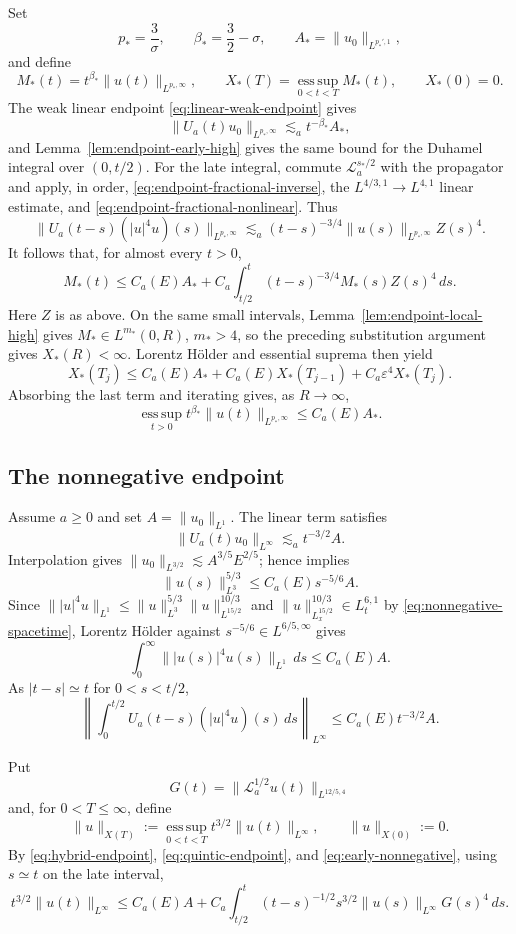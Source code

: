 \documentclass[preprint,12pt]{elsarticle}
\numberwithin{equation}{section}
\theoremstyle{definition}
\theoremstyle{remark}
\newcommand{\cL}{\mathcal L}
\newcommand{\norm}[2]{\lVert #1\rVert_{#2}}
\newcommand{\eps}{\varepsilon}
\begin{document}
Set
\[
 p_*=\frac3\sigma,\qquad
 \beta_*=\frac32-\sigma,\qquad
 A_*=\norm{u_0}{L^{p_*',1}},
\]
and define
\[
 M_*(t)=t^{\beta_*}\norm{u(t)}{L^{p_*,\infty}},
 \qquad X_*(T)=\operatorname*{ess\,sup}_{0<t<T}M_*(t),
 \qquad X_*(0)=0.
\]
The weak linear endpoint \eqref{eq:linear-weak-endpoint} gives
\[
 \norm{U_a(t)u_0}{L^{p_*,\infty}}
 \lesssim_a t^{-\beta_*}A_*,
\]
and Lemma~\ref{lem:endpoint-early-high} gives the same bound for the
Duhamel integral over $(0,t/2)$. For the late integral, commute
$\cL_a^{s_*/2}$ with the propagator and apply, in order,
\eqref{eq:endpoint-fractional-inverse}, the
$L^{4/3,1}\to L^{4,1}$ linear estimate, and
\eqref{eq:endpoint-fractional-nonlinear}. Thus
\[
 \norm{U_a(t-s)(|u|^4u)(s)}{L^{p_*,\infty}}
 \lesssim_a(t-s)^{-3/4}
 \norm{u(s)}{L^{p_*,\infty}}Z(s)^4.
\]
It follows that, for almost every $t>0$,
\[
 M_*(t)\leq C_a(E)A_*+
 C_a\int_{t/2}^t(t-s)^{-3/4}M_*(s)Z(s)^4\,ds.
\]
Here $Z$ is as above. On the same small intervals,
Lemma~\ref{lem:endpoint-local-high} gives $M_*\in L^{m_*}(0,R)$,
$m_*>4$, so the preceding substitution argument gives
$X_*(R)<\infty$. Lorentz H\"older and essential suprema then yield
\[
 X_*(T_j)
 \leq C_a(E)A_*+C_a(E)X_*(T_{j-1})
 +C_a\eps^4X_*(T_j).
\]
Absorbing the last term and iterating gives, as $R\to\infty$,
\[
 \operatorname*{ess\,sup}_{t>0}
 t^{\beta_*}\norm{u(t)}{L^{p_*,\infty}}
 \leq C_a(E)A_*.
\]

\subsection{The nonnegative endpoint}

Assume $a\geq0$ and set $A=\norm{u_0}{L^1}$.
The linear term satisfies
\[
 \norm{U_a(t)u_0}{L^\infty}\lesssim_a t^{-3/2}A.
\]
Interpolation gives $\norm{u_0}{L^{3/2}}\lesssim A^{3/5}E^{2/5}$;
hence \cite[Theorem~1.2, $p=3$]{WangXuZhang} implies
\[
 \norm{u(s)}{L^3}^{5/3}
 \leq C_a(E)s^{-5/6}A.
\]
Since $\norm{|u|^4u}{L^1}\leq
\norm{u}{L^3}^{5/3}\norm{u}{L^{15/2}}^{10/3}$ and
$\norm{u}{L_x^{15/2}}^{10/3}\in L_t^{6,1}$ by
\eqref{eq:nonnegative-spacetime}, Lorentz H\"older against
$s^{-5/6}\in L^{6/5,\infty}$ gives
\[
 \int_0^\infty\norm{|u(s)|^4u(s)}{L^1}\,ds
 \leq C_a(E)A.
\]
As $|t-s|\simeq t$ for $0<s<t/2$,
\begin{equation}
 \left\|\int_0^{t/2}U_a(t-s)(|u|^4u)(s)\,ds\right\|_{L^\infty}
 \leq C_a(E)t^{-3/2}A.
 \label{eq:early-nonnegative}
\end{equation}

Put
\[
 G(t)=\norm{\cL_a^{1/2}u(t)}{L^{12/5,4}}
\]
and, for $0<T\leq\infty$, define
\[
 \norm{u}{X(T)}
 :=\operatorname*{ess\,sup}_{0<t<T}
       t^{3/2}\norm{u(t)}{L^\infty},
 \qquad \norm{u}{X(0)}:=0.
\]
By \eqref{eq:hybrid-endpoint}, \eqref{eq:quintic-endpoint}, and
\eqref{eq:early-nonnegative}, using $s\simeq t$ on the late interval,
\[
 t^{3/2}\norm{u(t)}{L^\infty}
 \leq C_a(E)A+C_a\int_{t/2}^t(t-s)^{-1/2}
 s^{3/2}\norm{u(s)}{L^\infty}G(s)^4\,ds.
\]
\end{document}

